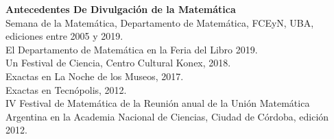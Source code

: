 \textbf{Antecedentes De Divulgaci\'on de la Matem\'atica}\\[6pt]
Semana de la Matem\'atica,  Departamento de Matem\'atica, FCEyN, UBA,
ediciones entre 2005 y 2019.\\[4pt]
El Departamento de Matem\'atica en la Feria del Libro 2019.\\[4pt]
Un Festival de Ciencia, Centro Cultural Konex, 2018.\\[4pt]
Exactas en La Noche de los Museos, 2017.\\[4pt] 
Exactas en Tecn\'opolis, 2012.\\[4pt]
IV Festival de Matem\'atica de la Reuni\'on anual de la Uni\'on Ma\-te\-m\'a\-ti\-ca
Argentina en la Academia Nacional de Ciencias, Ciudad de C\'ordoba,
edici\'on 2012.
